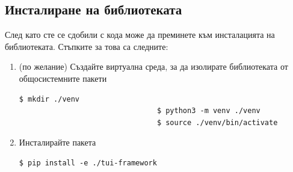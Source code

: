         \subsection{Инсталиране на библиотеката}

        След като сте се сдобили с кода може да преминете към инсталацията на 
        библиотеката. Стъпките за това са следните:

        \begin{enumerate}

                \item (по желание) Създайте виртуална среда, за да изолирате
                        библиотеката от общосистемните пакети 
                        \begin{lstlisting}[style=shell]
                                $ mkdir ./venv
                                $ python3 -m venv ./venv
                                $ source ./venv/bin/activate
                        \end{lstlisting}

                \item Инсталирайте пакета
                        \begin{lstlisting}[style=shell]
                                $ pip install -e ./tui-framework
                        \end{lstlisting}



        \end{enumerate}


